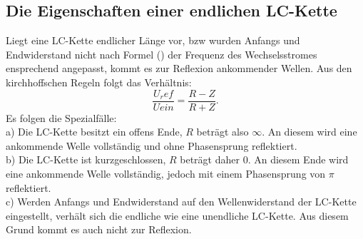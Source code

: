 \subsection{Die Eigenschaften einer endlichen LC-Kette}
Liegt eine LC-Kette endlicher Länge vor, bzw wurden Anfangs und Endwiderstand
 nicht nach Formel () der Frequenz des Wechselsstromes ensprechend angepasst,
  kommt es zur Reflexion ankommender Wellen. Aus den kirchhoffschen Regeln folgt das Verhältnis:
  \begin{equation}
    \frac{U_ref}{Uein} = \frac{R-Z}{R+Z}\text{.}
  \end{equation}
  Es folgen die Spezialfälle:\\
  a) Die LC-Kette besitzt ein offens Ende, $R$ beträgt also $\infty$. An diesem
   wird eine ankommende Welle vollständig und ohne Phasensprung reflektiert.\\

  b) Die LC-Kette ist kurzgeschlossen, $R$ beträgt daher 0. An diesem Ende wird
   eine ankommende Welle vollständig, jedoch mit einem Phasensprung von $\pi$ reflektiert.\\

 c) Werden Anfangs und Endwiderstand auf den Wellenwiderstand der LC-Kette eingestellt, verhält
  sich die endliche wie eine unendliche LC-Kette. Aus diesem Grund kommt es auch nicht zur Reflexion.
